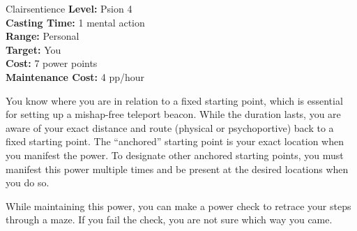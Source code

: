 {Clairsentience}
{
	\textbf{Level:}
	Psion 4\\
	\textbf{Casting Time:}
	1 mental action\\
	\textbf{Range:}
	Personal\\
	\textbf{Target:}
	You\\
	\textbf{Cost:}
	7 power points\\
	\textbf{Maintenance Cost:}
	4 pp/hour\\
}
{
	You know where you are in relation to a fixed starting point, which is essential for setting up a mishap-free teleport beacon. While the duration lasts, you are aware of your exact distance and route (physical or psychoportive) back to a fixed starting point. The “anchored” starting point is your exact location when you manifest the power. To designate other anchored starting points, you must manifest this power multiple times and be present at the desired locations when you do so.

	While maintaining this power, you can make a power check to retrace your steps through a maze. If you fail the check, you are not sure which way you came.
}